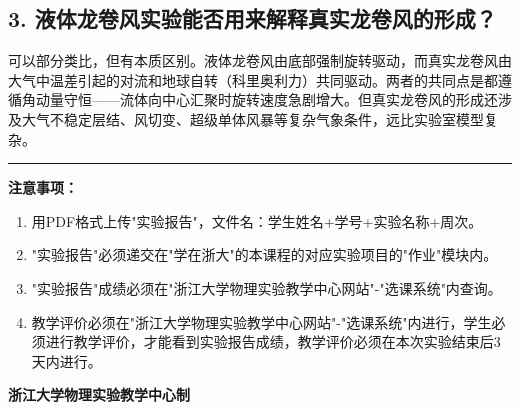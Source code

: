 \documentclass[a4paper,12pt]{article}
\begin{document}
\subsection{3. 液体龙卷风实验能否用来解释真实龙卷风的形成？}

可以部分类比，但有本质区别。液体龙卷风由底部强制旋转驱动，而真实龙卷风由大气中温差引起的对流和地球自转（科里奥利力）共同驱动。两者的共同点是都遵循角动量守恒——流体向中心汇聚时旋转速度急剧增大。但真实龙卷风的形成还涉及大气不稳定层结、风切变、超级单体风暴等复杂气象条件，远比实验室模型复杂。

\vfill

\noindent\rule{\textwidth}{0.4pt}

{\fontsize{12pt}{18pt}\selectfont
\textbf{注意事项：}
\begin{enumerate}[label=\arabic*., leftmargin=2em, nosep]
    \item 用PDF格式上传"实验报告"，文件名：学生姓名+学号+实验名称+周次。
    \item "实验报告"必须递交在"学在浙大"的本课程的对应实验项目的"作业"模块内。
    \item "实验报告"成绩必须在"浙江大学物理实验教学中心网站"-"选课系统"内查询。
    \item 教学评价必须在"浙江大学物理实验教学中心网站"-"选课系统"内进行，学生必须进行教学评价，才能看到实验报告成绩，教学评价必须在本次实验结束后3天内进行。
\end{enumerate}
}

\vspace{0.5cm}
\begin{center}
    {\fontsize{12pt}{18pt}\selectfont \textbf{浙江大学物理实验教学中心制}}
\end{center}
\end{document}
